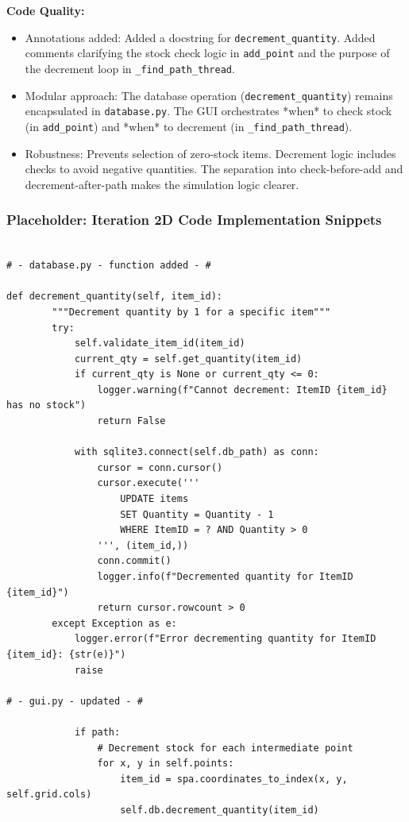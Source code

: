 \textbf{Code Quality:}
\begin{itemize}
	\item Annotations added: Added a docstring for \verb|decrement_quantity|. Added comments clarifying the stock check logic in \verb|add_point| and the purpose of the decrement loop in \verb|_find_path_thread|.
	\item Modular approach: The database operation (\verb|decrement_quantity|) remains encapsulated in \verb|database.py|. The GUI orchestrates *when* to check stock (in \verb|add_point|) and *when* to decrement (in \verb|_find_path_thread|).
	\item Robustness: Prevents selection of zero-stock items. Decrement logic includes checks to avoid negative quantities. The separation into check-before-add and decrement-after-path makes the simulation logic clearer.
\end{itemize}

\newpage
\subsubsection*{Placeholder: Iteration 2D Code Implementation Snippets}

\begin{verbatim}

# - database.py - function added - #

def decrement_quantity(self, item_id):
        """Decrement quantity by 1 for a specific item"""
        try:
            self.validate_item_id(item_id)
            current_qty = self.get_quantity(item_id)
            if current_qty is None or current_qty <= 0:
                logger.warning(f"Cannot decrement: ItemID {item_id} has no stock")
                return False
                
            with sqlite3.connect(self.db_path) as conn:
                cursor = conn.cursor()
                cursor.execute('''
                    UPDATE items 
                    SET Quantity = Quantity - 1
                    WHERE ItemID = ? AND Quantity > 0
                ''', (item_id,))
                conn.commit()
                logger.info(f"Decremented quantity for ItemID {item_id}")
                return cursor.rowcount > 0
        except Exception as e:
            logger.error(f"Error decrementing quantity for ItemID {item_id}: {str(e)}")
            raise

# - gui.py - updated - #

            if path:
                # Decrement stock for each intermediate point
                for x, y in self.points:
                    item_id = spa.coordinates_to_index(x, y, self.grid.cols)
                    self.db.decrement_quantity(item_id)

\end{verbatim}

